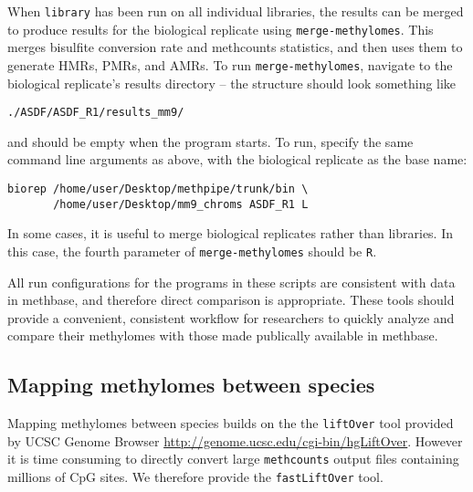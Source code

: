 \documentclass[10pt]{article}
\newcommand{\prog}[1]{\texttt{#1}}
\newcommand{\op}[1]{\texttt{#1}}
\begin{document}
When \prog{library} has been run on all individual libraries, the
results can be merged to produce results for the biological replicate using
\prog{merge-methylomes}. This merges bisulfite conversion rate and methcounts
statistics, and then uses them to generate HMRs, PMRs, and AMRs. To run
\prog{merge-methylomes}, navigate to the biological replicate's results
directory -- the structure should look something like
\begin{verbatim}
./ASDF/ASDF_R1/results_mm9/
\end{verbatim}
and should be empty when the program starts. To run, specify the same command
line arguments as above, with the biological replicate as the base name:
\begin{verbatim}
biorep /home/user/Desktop/methpipe/trunk/bin \
       /home/user/Desktop/mm9_chroms ASDF_R1 L
\end{verbatim}

In some cases, it is useful to merge biological replicates rather than
libraries. In this case, the fourth parameter of
\prog{merge-methylomes} should be \op{R}.

All run configurations for the programs in these scripts are
consistent with data in methbase, and therefore direct comparison is
appropriate. These tools should provide a convenient, consistent
workflow for researchers to quickly analyze and compare their
methylomes with those made publically available in methbase.

\subsection{Mapping methylomes between species}
\label{sec:mapp-methyl-betw}
Mapping methylomes between species builds on the the \prog{liftOver}
tool provided by UCSC Genome Browser
\url{http://genome.ucsc.edu/cgi-bin/hgLiftOver}. However it is time
consuming to directly convert large \prog{methcounts} output files
containing millions of CpG sites. We therefore provide the
\prog{fastLiftOver} tool.
\end{document}

